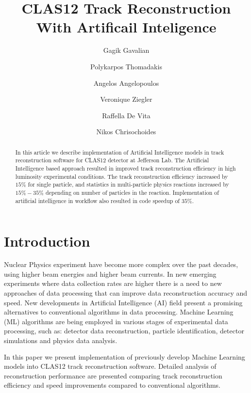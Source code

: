 \documentclass[preprint,12pt]{elsarticle}
\title{CLAS12 Track Reconstruction With Artificail Inteligence }
\author[1]{Gagik Gavalian}
\author[2]{Polykarpos Thomadakis }
\author[2]{Angelos Angelopoulos}
\author[1]{Veronique Ziegler}
\author[1]{Raffella De Vita}
\author[2]{Nikos Chrisochoides}
\begin{document}

\begin{abstract}

  In this article we describe implementation of Artificial Intelligence models in track reconstruction software for CLAS12 detector at Jefferson Lab.
 The Artificial Intelligence based approach resulted in improved track reconstruction efficiency in high luminosity experimental conditions.  The track
 reconstruction efficiency increased by $15\%$ for single particle, and statistics in multi-particle physics reactions increased by $15\%-35\%$ depending 
 on number of particles in the reaction. Implementation of artificial intelligence in workflow also resulted in code speedup of $35\%$.
\end{abstract}
\maketitle


\section{Introduction}
\indent

Nuclear Physics experiment have become more complex over the past decades, using higher beam energies and higher beam currents. In new emerging experiments where data collection rates are higher there is a need to new approaches of data processing that can improve data reconstruction accuracy and speed. New developments in Artificial Intelligence (AI) field present a promising alternatives to conventional algorithms in data processing. Machine Learning (ML) algorithms are being employed in various stages of experimental data processing, such as: detector data reconstruction, particle identification, detector simulations and physics data analysis. 

In this paper we present implementation of previously develop Machine Learning models into CLAS12 track reconstruction software. Detailed analysis 
of reconstruction performance are presented comparing track reconstruction efficiency and speed improvements compared to conventional algorithms.









\end{document}
